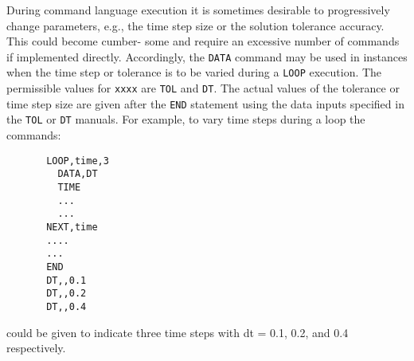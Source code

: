 \headb

During command language execution it is sometimes desirable to
progressively change parameters, e.g., the time step size or
the solution tolerance accuracy.  This could become cumber-
some and require an excessive number of commands if
implemented directly.  Accordingly, the {\tt DATA} command may
be used in instances when the time step or tolerance is to
be varied during a {\tt LOOP} execution.  The permissible values
for {\tt xxxx} are {\tt TOL} and {\tt DT}.
The actual values of the tolerance or time step size are
given after the {\tt END} statement using the data inputs
specified in the {\tt TOL} or {\tt DT} manuals.  For example, to
vary time steps during a loop the commands:

\begin{verbatim}
       LOOP,time,3
         DATA,DT
         TIME
         ...
         ...
       NEXT,time
       ....
       ...
       END
       DT,,0.1
       DT,,0.2
       DT,,0.4
\end{verbatim}
could be given to indicate three time steps with dt = 0.1,
0.2, and 0.4 respectively.
\vfill\eject
